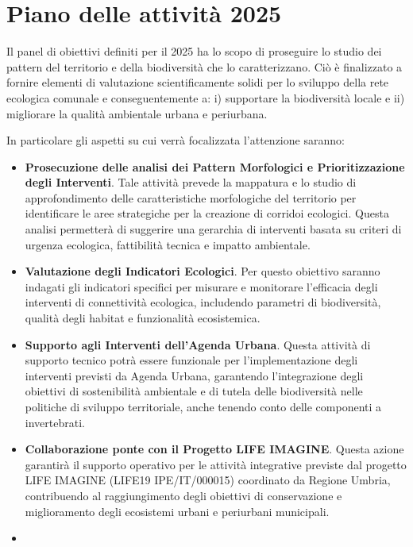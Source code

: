 \documentclass[
]{book}
\begin{document}
\section{Piano delle attività 2025}\label{piano-delle-attivituxe0-2025}

Il panel di obiettivi definiti per il 2025 ha lo scopo di proseguire lo
studio dei pattern del territorio e della biodiversità che lo
caratterizzano. Ciò è finalizzato a fornire elementi di valutazione
scientificamente solidi per lo sviluppo della rete ecologica comunale e
conseguentemente a: i) supportare la biodiversità locale e ii)
migliorare la qualità ambientale urbana e periurbana.

In particolare gli aspetti su cui verrà focalizzata l'attenzione
saranno:

\begin{itemize}
\item
  \textbf{Prosecuzione delle analisi dei Pattern Morfologici e
  Prioritizzazione degli Interventi}. Tale attività prevede la
  mappatura e lo studio di approfondimento delle caratteristiche
  morfologiche del territorio per identificare le aree strategiche per
  la creazione di corridoi ecologici. Questa analisi permetterà di
  suggerire una gerarchia di interventi basata su criteri di urgenza
  ecologica, fattibilità tecnica e impatto ambientale.
\item
  \textbf{Valutazione degli Indicatori Ecologici}. Per questo obiettivo
  saranno indagati gli indicatori specifici per misurare e monitorare
  l'efficacia degli interventi di connettività ecologica, includendo
  parametri di biodiversità, qualità degli habitat e funzionalità
  ecosistemica.
\item
  \textbf{Supporto agli Interventi dell'Agenda Urbana}. Questa attività di
  supporto tecnico potrà essere funzionale per l'implementazione degli
  interventi previsti da Agenda Urbana, garantendo l'integrazione
  degli obiettivi di sostenibilità ambientale e di tutela delle
  biodiversità nelle politiche di sviluppo territoriale, anche tenendo
  conto delle componenti a invertebrati.
\item
  \textbf{Collaborazione ponte con il Progetto LIFE IMAGINE}. Questa azione
  garantirà il supporto operativo per le attività integrative previste
  dal progetto LIFE IMAGINE (LIFE19 IPE/IT/000015) coordinato da
  Regione Umbria, contribuendo al raggiungimento degli obiettivi di
  conservazione e miglioramento degli ecosistemi urbani e periurbani
  municipali.
\item

\end{itemize}
\end{document}
